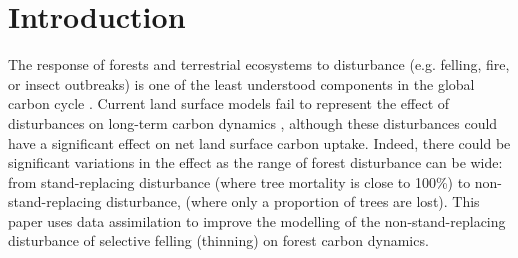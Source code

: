 \documentclass[draft,linenumbers]{agujournal}
\begin{document}

%
% 
% 
% 


\section{Introduction}

The response of forests and terrestrial ecosystems to disturbance (e.g. felling, fire, or insect outbreaks) is one of the least understood components in the global carbon cycle \citep{ciais2014carbon}. Current land surface models fail to represent the effect of disturbances on long-term carbon dynamics \citep{running2008ecosystem}, although these disturbances could have a significant effect on net land surface carbon uptake. Indeed, there could be significant variations in the effect as the range of forest disturbance can be wide: from {\color{blue}stand-replacing} disturbance (where tree mortality is close to 100\%) to non-{\color{blue}stand-replacing} disturbance, (where only a proportion of trees are lost). This paper uses data assimilation to improve the modelling of the non-{\color{blue}stand-replacing} disturbance of selective felling (thinning) on forest carbon dynamics.
\end{document}

